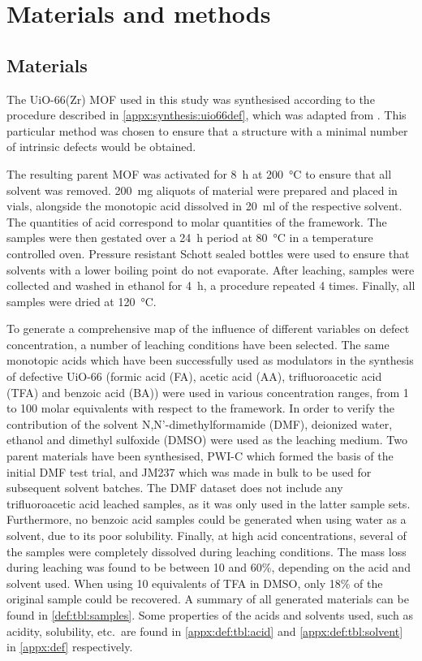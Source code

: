 
\section{Materials and methods}

\subsection{Materials}

The UiO-66(Zr) MOF used in this study was synthesised according
to the procedure described in \autoref{appx:synthesis:uio66def},
which was adapted from \citet{shearerTunedPerfectionIroning2014}.
This particular method was chosen to ensure that a structure with
a minimal number of intrinsic defects would be obtained.

The resulting parent MOF was activated for \SI{8}{\hour} at
\SI{200}{\degreeCelsius} to ensure that all solvent was removed.
\SI{200}{\milli\gram} aliquots of material were prepared and 
placed in vials, alongside the monotopic acid dissolved in
\SI{20}{\milli\litre} of the respective solvent. The quantities
of acid correspond to molar quantities of the framework.
The samples were then gestated over a \SI{24}{\hour} period
at \SI{80}{\degreeCelsius} in a temperature controlled oven.
Pressure resistant Schott sealed bottles were used to ensure that
solvents with a lower boiling point do not evaporate.
After leaching, samples were collected and washed in ethanol
for \SI{4}{\hour}, a procedure repeated 4 times. Finally, all 
samples were dried at \SI{120}{\degreeCelsius}.

To generate a comprehensive map of the influence
of different variables on defect concentration, a number of
leaching conditions have been selected. The same monotopic acids 
which have been successfully used
as modulators in the synthesis of defective UiO-66
(formic acid (FA), acetic acid (AA), trifluoroacetic acid (TFA)
and benzoic acid (BA)) were used in various concentration ranges,
from 1 to 100 molar equivalents with respect to the framework.
In order to verify the contribution of the solvent
N,N'-dimethylformamide (DMF), deionized water, ethanol and dimethyl
sulfoxide (DMSO) were used as the leaching medium.
Two parent materials have been synthesised, PWI-C which formed 
the basis of the initial DMF test trial, and JM237 which 
was made in bulk to be used for subsequent solvent batches.
The DMF dataset does not include any trifluoroacetic acid
leached samples, as it was only used in the latter sample sets.
Furthermore, no benzoic acid samples could be generated when using
water as a solvent, due to its poor solubility. Finally, 
at high acid concentrations, several of the samples were completely
dissolved during leaching
conditions. The mass loss during leaching was found to be 
between 10 and 60\%, depending on the acid and solvent used.
When using 10 equivalents of TFA in DMSO, only 18\% of the 
original sample could be recovered. 
A summary of all generated materials can be found in
\autoref{def:tbl:samples}.
Some properties of the acids and solvents used, such as acidity,
solubility, etc.\ are found in 
\autoref{appx:def:tbl:acid} and \autoref{appx:def:tbl:solvent} in 
\autoref{appx:def} respectively.

